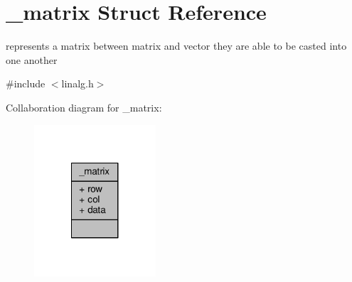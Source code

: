 \hypertarget{struct__matrix}{\section{\-\_\-matrix Struct Reference}
\label{struct__matrix}
}


represents a matrix between matrix and vector they are able to be casted into one another  




{\ttfamily \#include $<$linalg.\-h$>$}



Collaboration diagram for \-\_\-matrix\-:\nopagebreak
\begin{figure}[H]
\begin{center}
\leavevmode
\includegraphics[width=128pt]{struct__matrix__coll__graph}
\end{center}
\end{figure}
